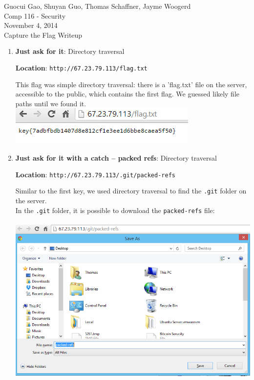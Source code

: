 \documentclass[12pt]{article}
\begin{document}
Guocui Gao, Shuyan Guo, Thomas Schaffner, Jayme Woogerd \\
\indent Comp 116 - Security \\
\indent November 4, 2014 \\
\indent Capture the Flag Writeup \\

\begin{enumerate}[1.]
\item \textbf{Just ask for it}: Directory traversal

\textbf{Location}: \texttt{http://67.23.79.113/flag.txt}

This flag was simple directory traversal: there is a 'flag.txt' file on the server, accessible to the public, which contains the first flag. We guessed likely file paths until we found it.\\

	\includegraphics[scale=0.8]{images/flag1} \\

\item \textbf{Just ask for it with a catch -- packed refs}: Directory traversal

\textbf{Location}: \texttt{http://67.23.79.113/.git/packed-refs}

Similar to the first key, we used directory traversal to find the \texttt{.git} folder on the server. \\
In the \texttt{.git} folder, it is possible to download the \texttt{packed-refs} file: \\ \\

	\includegraphics[scale=0.5]{images/flag2a} \\ \\


\end{enumerate}
\end{document}
